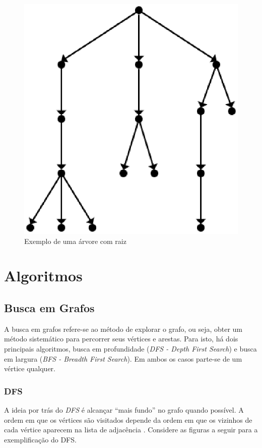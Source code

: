 \begin{figure}[!h]
	\centering
	\includegraphics[scale=0.2]{figuras/capitulo2/arvore_raiz.eps}
	\caption{Exemplo de uma árvore com raiz}
	\label{arvore_raiz}
\end{figure}

\section{Algoritmos}

\subsection{Busca em Grafos}

A busca em grafos refere-se ao método de explorar o grafo, ou seja, obter um método sistemático para percorrer seus vértices e arestas. Para isto, há dois principais algoritmos, busca em profundidade (\textit{DFS - Depth First Search}) e busca em largura (\textit{BFS - Breadth First Search}). Em ambos os casos parte-se de um vértice qualquer.

\subsubsection{DFS}
A ideia por trás do \textit{DFS} é alcançar ``mais fundo'' no grafo quando possível. A ordem em que os vértices são visitados depende da ordem em que os vizinhos de cada vértice aparecem na lista de adjacência \cite{Cormen:2001}. Considere as figuras a seguir para a exemplificação do DFS.

